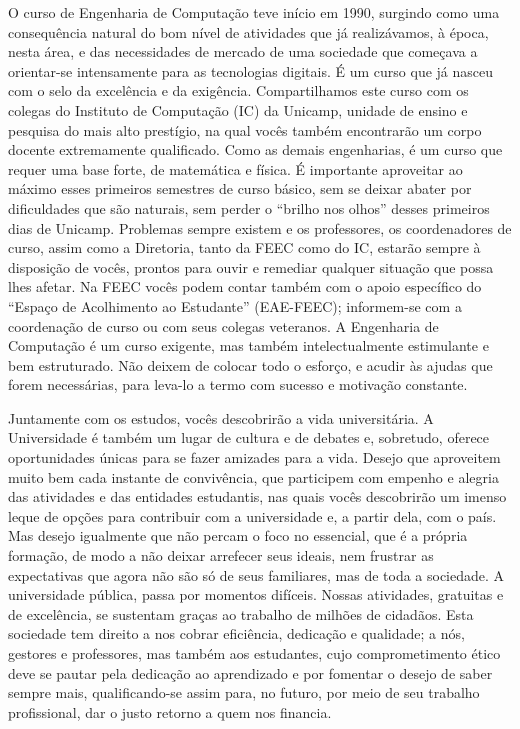 O curso de Engenharia de Computação teve início em 1990, surgindo como uma
consequência natural do bom nível de atividades que já realizávamos, à época,
nesta área, e das necessidades de mercado de uma sociedade que começava a
orientar-se intensamente para as tecnologias digitais. É um curso que já nasceu
com o selo da excelência e da exigência. Compartilhamos este curso com os
colegas do Instituto de Computação (IC) da Unicamp, unidade de ensino e
pesquisa do mais alto prestígio, na qual vocês também encontrarão um corpo
docente extremamente qualificado. Como as demais engenharias, é um curso que
requer uma base forte, de matemática e física. É importante aproveitar ao
máximo esses primeiros semestres de curso básico, sem se deixar abater por
dificuldades que são naturais, sem perder o ``brilho nos olhos'' desses
primeiros dias de Unicamp. Problemas sempre existem e os professores, os
coordenadores de curso, assim como a Diretoria, tanto da FEEC como do IC,
estarão sempre à disposição de vocês, prontos para ouvir e remediar qualquer
situação que possa lhes afetar. Na FEEC vocês podem contar também com o apoio
específico do ``Espaço de Acolhimento ao Estudante'' (EAE-FEEC); informem-se
com a coordenação de curso ou com seus colegas veteranos. A Engenharia de
Computação é um curso exigente, mas também intelectualmente estimulante e bem
estruturado. Não deixem de colocar todo o esforço, e acudir às ajudas que forem
necessárias, para leva-lo a termo com sucesso e motivação constante.

Juntamente com os estudos, vocês descobrirão a vida universitária. A
Universidade é também um lugar de cultura e de debates e, sobretudo, oferece
oportunidades únicas para se fazer amizades para a vida. Desejo que aproveitem
muito bem cada instante de convivência, que participem com empenho e alegria
das atividades e das entidades estudantis, nas quais vocês descobrirão um
imenso leque de opções para contribuir com a universidade e, a partir dela, com
o país. Mas desejo igualmente que não percam o foco no essencial, que é a
própria formação, de modo a não deixar arrefecer seus ideais, nem frustrar as
expectativas que agora não são só de seus familiares, mas de toda a sociedade.
A universidade pública, passa por momentos difíceis. Nossas atividades,
gratuitas e de excelência, se sustentam graças ao trabalho de milhões de
cidadãos. Esta sociedade tem direito a nos cobrar eficiência, dedicação e
qualidade; a nós, gestores e professores, mas também aos estudantes, cujo
comprometimento ético deve se pautar pela dedicação ao aprendizado e por
fomentar o desejo de saber sempre mais, qualificando-se assim para, no futuro,
por meio de seu trabalho profissional, dar o justo retorno a quem nos financia.

